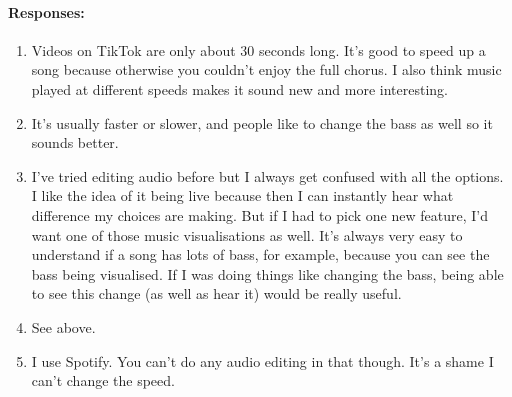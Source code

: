 {{\begin{minipage}{15cm}
		\paragraph{Responses:}
		\begin{enumerate}
			\item Videos on TikTok are only about 30 seconds long. It's good to speed up a song because otherwise you couldn't enjoy the full chorus. I also think music played at different speeds makes it sound new and more interesting.
			\item It's usually faster or slower, and people like to change the bass as well so it sounds better.
			\item I've tried editing audio before but I always get confused with all the options. I like the idea of it being live because then I can instantly hear what difference my choices are making. But if I had to pick one new feature, I'd want one of those music visualisations as well. It's always very easy to understand if a song has lots of bass, for example, because you can see the bass being visualised. If I was doing things like changing the bass, being able to see this change (as well as hear it) would be really useful.
			\item See above.
			\item I use Spotify. You can't do any audio editing in that though. It's a shame I can't change the speed.
		\end{enumerate}
		\bigskip \bigskip \bigskip
\end{minipage}}
}

\pagebreak
